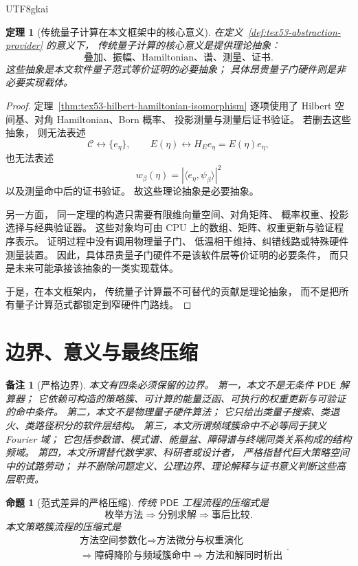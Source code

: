 \documentclass[12pt]{article}
\newtheorem{theorem}{定理}[section]
\newtheorem{proposition}{命题}[section]
\newtheorem{remark}{备注}[section]
\newcommand{\PDE}{\mathsf{PDE}}
\begin{document}
\begin{CJK*}{UTF8}{gkai}
\begin{theorem}[传统量子计算在本文框架中的核心意义]
\label{thm:tex53-quantum-theory-core-meaning}
在定义~\ref{def:tex53-abstraction-provider} 的意义下，
传统量子计算的核心意义是提供理论抽象：
\[
  \text{叠加、振幅、Hamiltonian、谱、测量、证书}.
\]
这些抽象是本文软件量子范式等价证明的必要抽象；
具体昂贵量子门硬件则是非必要实现载体。
\end{theorem}

\begin{proof}
定理~\ref{thm:tex53-hilbert-hamiltonian-isomorphism}
逐项使用了 Hilbert 空间基、对角 Hamiltonian、Born 概率、
投影测量与测量后证书验证。
若删去这些抽象，
则无法表述
\[
  \mathcal C
  \longleftrightarrow
  \{e_\eta\},
  \qquad
  E(\eta)
  \longleftrightarrow
  H_Ee_\eta=E(\eta)e_\eta,
\]
也无法表述
\[
  w_\beta(\eta)
  =
  |\langle e_\eta,\psi_\beta\rangle|^2
\]
以及测量命中后的证书验证。
故这些理论抽象是必要抽象。

另一方面，
同一定理的构造只需要有限维向量空间、对角矩阵、
概率权重、投影选择与经典验证器。
这些对象均可由 CPU 上的数组、矩阵、权重更新与验证程序表示。
证明过程中没有调用物理量子门、
低温相干维持、纠错线路或特殊硬件测量装置。
因此，具体昂贵量子门硬件不是该软件层等价证明的必要条件，
而只是未来可能承接该抽象的一类实现载体。

于是，在本文框架内，
传统量子计算最不可替代的贡献是理论抽象，
而不是把所有量子计算范式都锁定到窄硬件门路线。
\end{proof}

\section{边界、意义与最终压缩}
\label{sec:tex53-conclusion}

\begin{remark}[严格边界]
本文有四条必须保留的边界。
第一，本文不是无条件 \(\PDE\) 解算器；
它依赖可构造的策略簇、可计算的能量泛函、可执行的权重更新与可验证的命中条件。
第二，本文不是物理量子硬件算法；
它只给出类量子搜索、类退火、类路径积分的软件层结构。
第三，本文所谓频域簇命中不必等同于狭义 Fourier 域；
它包括参数谱、模式谱、能量盆、障碍谱与终端同类关系构成的结构频域。
第四，本文所谓替代数学家、科研者或设计者，
严格指替代巨大策略空间中的试路劳动；
并不删除问题定义、公理边界、理论解释与证书意义判断这些高层职责。
\end{remark}

\begin{proposition}[范式差异的严格压缩]
传统 \(\PDE\) 工程流程的压缩式是
\[
  \boxed{
    \text{枚举方法}
    \Longrightarrow
    \text{分别求解}
    \Longrightarrow
    \text{事后比较}
  }.
\]
本文策略簇流程的压缩式是
\[
  \boxed{
    \begin{aligned}
      &\text{方法空间参数化}
      \Longrightarrow
      \text{方法微分与权重演化}\\
      &\Longrightarrow
      \text{障碍降阶与频域簇命中}
      \Longrightarrow
      \text{方法和解同时析出}
    \end{aligned}
  }.
\]
\end{proposition}


\end{CJK*}
\end{document}
